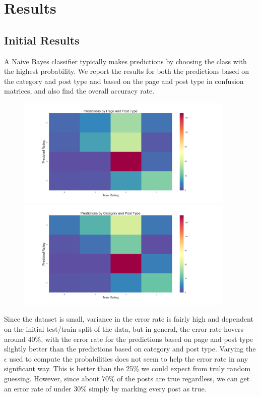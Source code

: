 \documentclass[12pt]{article}
\newcommand{\e}{\epsilon}
\begin{document}
\section*{Results}
\subsection*{Initial Results}
A Naive Bayes classifier typically makes predictions by choosing the class with the highest probability. We report the results for both the predictions based on the category and post type and based on the page and post type in confusion matrices, and also find the overall accuracy rate.

\begin{figure}[H] 
    \centering
    \includegraphics[width=0.93\textwidth]{page_predicts.png}
    \includegraphics[width=0.93\textwidth]{cat_predicts.png}
\end{figure}

Since the dataset is small, variance in the error rate is fairly high and dependent on the initial test/train split of the data, but in general, the error rate hovers around 40\%, with the error rate for the predictions based on page and post type slightly better than the predictions based on category and post type. Varying the $\e$ used to compute the probabilities does not seem to help the error rate in any significant way. This is better than the 25\% we could expect from truly random guessing. However, since about 70\% of the posts are true regardless, we can get an error rate of under 30\% simply by marking every post as true. 
\end{document}

